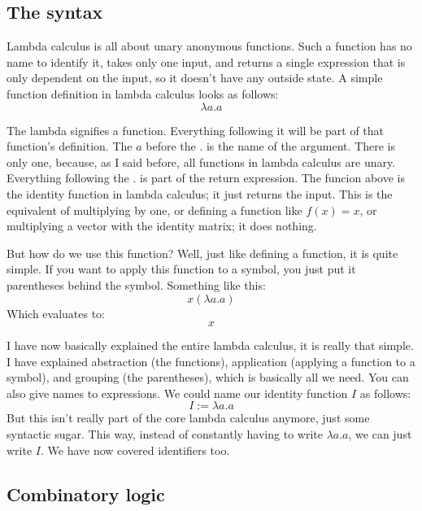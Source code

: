\documentclass[a4paper, 11pt]{article}
\begin{document}

\subsection{The syntax}

Lambda calculus is all about unary anonymous functions. Such a function has no
name to identify it, takes only one input, and returns a single expression that
is only dependent on the input, so it doesn't have any outside state. A simple
function definition in lambda calculus looks as follows:
\[\lambda a.a\]

The lambda signifies a function. Everything following it will be part of that
function's definition. The \(a\) before the \(.\) is the name of the argument.
There is only one, because, as I said before, all functions in lambda calculus
are unary. Everything following the \(.\) is part of the return expression. The
funcion above is the identity function in lambda calculus; it just returns the
input. This is the equivalent of multiplying by one, or defining a function
like \(f(x)=x\), or multiplying a vector with the identity matrix; it does
nothing.

But how do we use this function? Well, just like defining a function, it is
quite simple. If you want to apply this function to a symbol, you just put it
parentheses behind the symbol. Something like this:
\[x(\lambda a.a)\]
Which evaluates to:
\[x\]

I have now basically explained the entire lambda calculus, it is really that
simple. I have explained abstraction (the functions), application (applying a
function to a symbol), and grouping (the parentheses), which is basically all
we need. You can also give names to expressions. We could name our identity
function \(I\) as follows: \[I:=\lambda a.a\] But this isn't really part of the
core lambda calculus anymore, just some syntactic sugar. This way, instead
of constantly having to write \(\lambda a.a\), we can just write \(I\). We have
now covered identifiers too.

\subsection{Combinatory logic}

\end{document}
